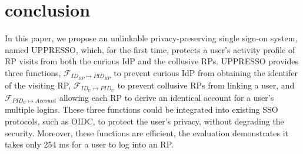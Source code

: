 \section{conclusion}
\label{sec:conclusion}
In this paper, we propose an unlinkable privacy-preserving single sign-on system, named UPPRESSO, which, for the first time, protects a user's activity profile of RP visits from both the curious IdP and the collusive RPs.
UPPRESSO provides three functions, $\mathcal{F}_{ID_{RP} \mapsto PID_{RP}}$ to prevent curious IdP from obtaining the identifer of the visiting RP,
 $\mathcal{F}_{ID_{U} \mapsto PID_{U}}$ to prevent collusive RPs from linking a user, and $\mathcal{F}_{PID_{U} \mapsto Account}$ allowing each RP to derive an identical account for a user's multiple logins.
These three functions could be integrated into existing SSO protocols, such as OIDC, to protect the user's privacy, without degrading the security.
Moreover, these functions are efficient, the evaluation demonstrates it takes only 254 ms for a user to log into an RP.
